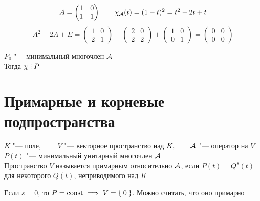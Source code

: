 \begin{eg}
	$$ A =
	\begin{pmatrix}
		1 & 0 \\
		1 & 1
	\end{pmatrix} \qquad \chi_{\mathcal{A}}(t) = (1 - t)^2 = t^2 - 2t + t $$
	$$ A^2 - 2A + E =
	\begin{pmatrix}
		1 & 0 \\
		2 & 1
	\end{pmatrix} -
	\begin{pmatrix}
		2 & 0 \\
		2 & 2
	\end{pmatrix} +
	\begin{pmatrix}
		1 & 0 \\
		0 & 1
	\end{pmatrix} =
	\begin{pmatrix}
		0 & 0 \\
		0 & 0
	\end{pmatrix} $$
\end{eg}

\begin{implication}
	$ P_0 $ "--- минимальный многочлен $ \mathcal{A} $ \\
	Тогда $ \chi \divby P $
\end{implication}

\section{Примарные и корневые подпространства}

\begin{definition}
	$ K $ "--- поле, $ \qquad V $ "--- векторное пространство над $ K, \qquad \mathcal{A} $ "--- оператор на $ V $ \\
	$ P(t) $ "--- минимальный унитарный многочлен $ \mathcal{A} $   \\
	Пространство $ V $ называется примарным относительно $ \mathcal{A} $, если $ P(t) = Q^s(t) $ для некоторого $ Q(t) $, неприводимого над $ K $
\end{definition}

\begin{remark}
	Если $ s = 0 $, то $ P = \operatorname{const} \implies V = \Set{0} $. Можно считать, что оно примарно
\end{remark}

